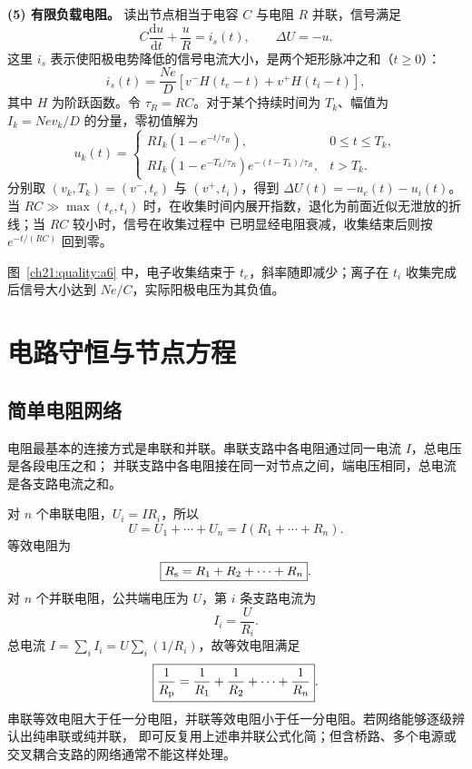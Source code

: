 {\begin{xesolution}
\textbf{(5) 有限负载电阻。} 读出节点相当于电容 $C$ 与电阻 $R$ 并联，信号满足
\[
  C\frac{\mathrm d u}{\mathrm dt}+\frac{u}{R}=i_s(t),\qquad \Delta U=-u.
\]
这里 $i_s$ 表示使阳极电势降低的信号电流大小，是两个矩形脉冲之和（$t\ge0$）：
\[
  i_s(t)=\frac{Ne}{D}\left[v^-H(t_e-t)+v^+H(t_i-t)\right],
\]
其中 $H$ 为阶跃函数。令 $\tau_R=RC$。对于某个持续时间为 $T_k$、幅值为
$I_k=Ne v_k/D$ 的分量，零初值解为
\[
  u_k(t)=
  \begin{cases}
    RI_k\left(1-e^{-t/\tau_R}\right),&0\le t\le T_k,\\[2mm]
    RI_k\left(1-e^{-T_k/\tau_R}\right)e^{-(t-T_k)/\tau_R},&t>T_k.
  \end{cases}
\]
分别取 $(v_k,T_k)=(v^-,t_e)$ 与 $(v^+,t_i)$，得到 $\Delta U(t)=-u_e(t)-u_i(t)$。当
$RC\gg\max(t_e,t_i)$ 时，在收集时间内展开指数，退化为前面近似无泄放的折线；当 $RC$ 较小时，信号在收集过程中
已明显经电阻衰减，收集结束后则按 $e^{-t/(RC)}$ 回到零。

图~\ref{ch21:quality:a6} 中，电子收集结束于 $t_e$，斜率随即减少；离子在 $t_i$ 收集完成后信号大小达到 $Ne/C$，实际阳极电压为其负值。
\end{xesolution}



\section{电路守恒与节点方程}

\subsection{简单电阻网络}


电阻最基本的连接方式是串联和并联。串联支路中各电阻通过同一电流 $I$，总电压是各段电压之和；
并联支路中各电阻接在同一对节点之间，端电压相同，总电流是各支路电流之和。

\par\noindent\begin{minipage}{\linewidth}
\seriesParallelResistorsFigure
{}
\end{minipage}\par\medskip

对 $n$ 个串联电阻，$U_i=IR_i$，所以
\[
  U=U_1+\cdots+U_n=I(R_1+\cdots+R_n).
\]
等效电阻为
\begin{equation}
  \boxed{R_{\rm s}=R_1+R_2+\cdots+R_n}.
\end{equation}
对 $n$ 个并联电阻，公共端电压为 $U$，第 $i$ 条支路电流为
\begin{equation}
  \boxed{I_i=\frac{U}{R_i}}.
\end{equation}
总电流
$I=\sum_i I_i=U\sum_i(1/R_i)$，故等效电阻满足
\begin{equation}
  \boxed{\frac1{R_{\rm p}}=\frac1{R_1}+\frac1{R_2}+\cdots+\frac1{R_n}}.
\end{equation}
串联等效电阻大于任一分电阻，并联等效电阻小于任一分电阻。若网络能够逐级辨认出纯串联或纯并联，
即可反复用上述串并联公式化简；但含桥路、多个电源或交叉耦合支路的网络通常不能这样处理。


}
